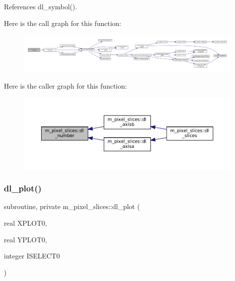 References dl\+\_\+symbol().

Here is the call graph for this function\+:\nopagebreak
\begin{figure}[H]
\begin{center}
\leavevmode
\includegraphics[width=350pt]{namespacem__pixel__slices_a7d9372496e88c384aea5ad1b26750d1b_cgraph}
\end{center}
\end{figure}
Here is the caller graph for this function\+:\nopagebreak
\begin{figure}[H]
\begin{center}
\leavevmode
\includegraphics[width=350pt]{namespacem__pixel__slices_a7d9372496e88c384aea5ad1b26750d1b_icgraph}
\end{center}
\end{figure}
\mbox{\label{namespacem__pixel__slices_aa70737b5f5945b2f513163ee5c40942d}} 
\subsubsection{\texorpdfstring{dl\+\_\+plot()}{dl\_plot()}}
{\footnotesize\ttfamily subroutine, private m\+\_\+pixel\+\_\+slices\+::dl\+\_\+plot (\begin{DoxyParamCaption}\item[{real}]{X\+P\+L\+O\+T0,  }\item[{real}]{Y\+P\+L\+O\+T0,  }\item[{integer}]{I\+S\+E\+L\+E\+C\+T0 }\end{DoxyParamCaption})\hspace{0.3cm}{\ttfamily [private]}}



